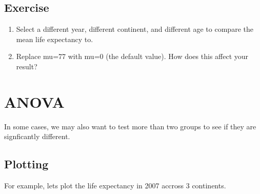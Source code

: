 \documentclass[]{book}
\makeatletter
\newenvironment{Shaded}{\begin{snugshade}}{\end{snugshade}}
\newcommand{\DataTypeTok}[1]{\textcolor[rgb]{0.13,0.29,0.53}{#1}}
\newcommand{\DecValTok}[1]{\textcolor[rgb]{0.00,0.00,0.81}{#1}}
\newcommand{\KeywordTok}[1]{\textcolor[rgb]{0.13,0.29,0.53}{\textbf{#1}}}
\newcommand{\NormalTok}[1]{#1}
\newcommand{\OperatorTok}[1]{\textcolor[rgb]{0.81,0.36,0.00}{\textbf{#1}}}
\newcommand{\StringTok}[1]{\textcolor[rgb]{0.31,0.60,0.02}{#1}}
\newenvironment{kframe}{%
\medskip{}
\setlength{\fboxsep}{.8em}
 \def\at@end@of@kframe{}%
 \ifinner\ifhmode%
  \def\at@end@of@kframe{\end{minipage}}%
  \begin{minipage}{\columnwidth}%
 \fi\fi%
 \def\FrameCommand##1{\hskip\@totalleftmargin \hskip-\fboxsep
 \colorbox{shadecolor}{##1}\hskip-\fboxsep
     \hskip-\linewidth \hskip-\@totalleftmargin \hskip\columnwidth}%
 \MakeFramed {\advance\hsize-\width
   \@totalleftmargin\z@ \linewidth\hsize
   \@setminipage}}%
 {\par\unskip\endMakeFramed%
 \at@end@of@kframe}
\renewenvironment{Shaded}{\begin{kframe}}{\end{kframe}}
\theoremstyle{definition}
\theoremstyle{definition}
\theoremstyle{definition}
\theoremstyle{remark}
\makeatother
\begin{document}
\hypertarget{exercise-26}{%
\subsection{Exercise}\label{exercise-26}}

\begin{enumerate}
\def\labelenumi{\arabic{enumi}.}
\item
  Select a different year, different continent, and different age to
  compare the mean life expectancy to.
\item
  Replace mu=77 with mu=0 (the default value). How does this affect your
  result?
\end{enumerate}

\hypertarget{anova}{%
\section{ANOVA}\label{anova}}

In some cases, we may also want to test more than two groups to see if
they are signficantly different.

\hypertarget{plotting-1}{%
\subsection{Plotting}\label{plotting-1}}

For example, lets plot the life expectancy in 2007 accross 3 continents.

\begin{Shaded}
\end{Shaded}
\end{document}
